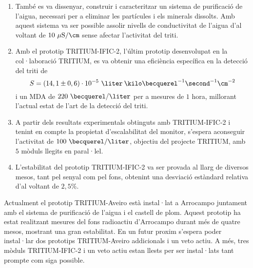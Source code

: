 \begin{enumerate}
\item{} També es va dissenyar, construir i caracteritzar un sistema de purificació de l'aigua, necessari per a eliminar les partícules i els minerals dissolts. Amb aquest sistema va ser possible assolir nivells de conductivitat de l'aigua d'al voltant de $10~\mu\text{S}/\cm$ sense afectar l'activitat del triti.

\item{} Amb el prototip TRITIUM-IFIC-2, l'últim prototip desenvolupat en la col·laboració TRITIUM, es va obtenir una eficiència específica en la detecció del triti de
$$S = (14,1 \pm 0,6)\cdot{} 10^{-5}~\liter\:\kilo\becquerel^{-1}\second^{-1}\cm^{-2}$$
i un MDA de $220~\becquerel/\liter$ per a mesures de $1$ hora, millorant l'actual estat de l'art de la detecció del triti.

\item{} A partir dels resultats experimentals obtinguts amb TRITIUM-IFIC-2 i tenint en compte la propietat d'escalabilitat del monitor, s'espera aconseguir l'activitat de $100~\becquerel/\liter$, objectiu del projecte TRITIUM, amb $5$ mòduls llegits en paral·lel.

\item{} L'estabilitat del prototip TRITIUM-IFIC-2 va ser provada al llarg de diversos mesos, tant pel senyal com pel fons, obtenint una desviació estàndard relativa d'al voltant de $2,5\%$.

\end{enumerate}

Actualment el prototip TRITIUM-Aveiro està instal·lat a Arrocampo juntament amb el sistema de purificació de l'aigua i el castell de plom. Aquest prototip ha estat realitzant mesures del fons radioactiu d'Arrocampo durant més de quatre mesos, mostrant una gran estabilitat. En un futur proxim s'espera poder instal·lar dos prototips TRITIUM-Aveiro addicionals i un veto actiu. A més, tres mòduls TRITIUM-IFIC-2 i un veto actiu estan llests per ser instal·lats tant prompte com siga possible.